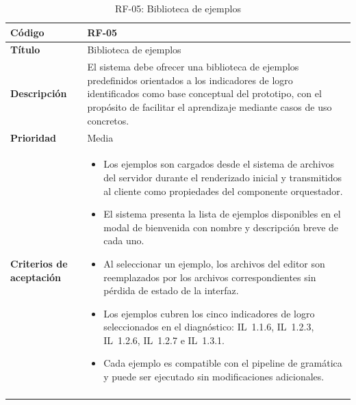 \begin{longtable}{|>{\bfseries}p{3cm}|p{11cm}|}
\hline
\textbf{Código} & RF-05 \\
\hline
\textbf{Título} & Biblioteca de ejemplos \\
\hline
\textbf{Descripción} & El sistema debe ofrecer una biblioteca de ejemplos predefinidos orientados a los indicadores de logro identificados como base conceptual del prototipo, con el propósito de facilitar el aprendizaje mediante casos de uso concretos. \\
\hline
\textbf{Prioridad} & Media \\
\hline
\textbf{Criterios de aceptación} &
\begin{itemize}[leftmargin=*,topsep=2pt,itemsep=1pt,parsep=0pt]
    \item Los ejemplos son cargados desde el sistema de archivos del servidor durante el renderizado inicial y transmitidos al cliente como propiedades del componente orquestador.
    \item El sistema presenta la lista de ejemplos disponibles en el modal de bienvenida con nombre y descripción breve de cada uno.
    \item Al seleccionar un ejemplo, los archivos del editor son reemplazados por los archivos correspondientes sin pérdida de estado de la interfaz.
    \item Los ejemplos cubren los cinco indicadores de logro seleccionados en el diagnóstico: IL~1.1.6, IL~1.2.3, IL~1.2.6, IL~1.2.7 e IL~1.3.1.
    \item Cada ejemplo es compatible con el pipeline de gramática y puede ser ejecutado sin modificaciones adicionales.
\end{itemize} \\
\hline
\caption{RF-05: Biblioteca de ejemplos}
\label{tab:rf05}
\end{longtable}

